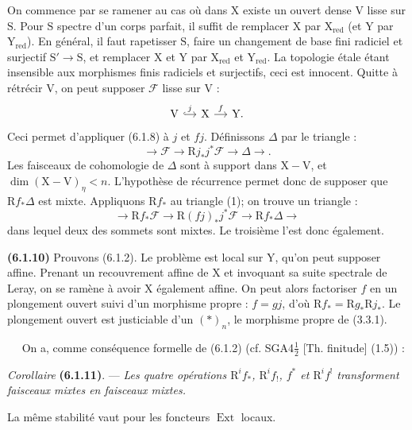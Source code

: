 \documentclass[11pt,leqno]{article}
\newcommand{\Page}[1]{\ifvmode\noindent\else\unskip\ \fi{\footnotesize\textcolor{gray}{[p.\,#1]}}\ \ignorespaces}
\begin{document}
On commence par se ramener au cas où dans \(\mathrm{X}\) existe
un ouvert dense \(\mathrm{V}\) lisse sur \(\mathrm{S}\). Pour
\(\mathrm{S}\) spectre d’un corps parfait, il suffit de remplacer
\(\mathrm{X}\) par \(\mathrm{X}_{\mathrm{red}}\) (et \(\mathrm{Y}\)
par \(\mathrm{Y}_{\mathrm{red}}\)). En général, il faut rapetisser
\(\mathrm{S}\), faire un changement de base fini radiciel et
surjectif \(\mathrm{S}'\to\mathrm{S}\), et remplacer \(\mathrm{X}\)
et \(\mathrm{Y}\) par \(\mathrm{X}_{\mathrm{red}}\) et
\(\mathrm{Y}_{\mathrm{red}}\). La topologie étale étant insensible
aux morphismes finis radiciels et surjectifs, ceci est innocent.
Quitte à rétrécir \(\mathrm{V}\), on peut supposer \(\mathscr{F}\)
lisse sur \(\mathrm{V}\) :
\[
\begin{tikzcd}[column sep=small]
\mathrm{V} \arrow[r,hook,"j"] &
\mathrm{X} \arrow[r,"f"] &
\mathrm{Y}.
\end{tikzcd}
\]
Ceci permet d’appliquer (6.1.8) à \(j\) et \(fj\). Définissons
\(\Delta\) par le triangle :
\[
\tag*{(1)}
\to\mathscr{F}\to\mathrm{R}j_*j^*\mathscr{F}\to\Delta\to.
\]
Les faisceaux de cohomologie de \(\Delta\) sont à support dans
\(\mathrm{X}-\mathrm{V}\), et
\(\dim(\mathrm{X}-\mathrm{V})_\eta<n\). L’hypothèse de récurrence
permet donc de supposer que \(\mathrm{R}f_*\Delta\) est mixte.
Appliquons \(\mathrm{R}f_*\) au triangle (1); on trouve un triangle :
\[
\to\mathrm{R}f_*\mathscr{F}
\to\mathrm{R}(fj)_*j^*\mathscr{F}
\to\mathrm{R}f_*\Delta\to
\]
dans lequel deux des sommets sont mixtes. Le troisième l’est donc
également.

\textbf{(6.1.10)} Prouvons (6.1.2). Le problème est local sur
\(\mathrm{Y}\), qu’on peut supposer affine. Prenant un recouvrement
affine de \(\mathrm{X}\) et invoquant sa suite spectrale de Leray,
on se ramène à avoir \(\mathrm{X}\) également affine. On peut alors
factoriser \(f\) en un plongement ouvert suivi d’un morphisme propre :
\(f=gj\), d’où \(\mathrm{R}f_*=\mathrm{R}g_*\mathrm{R}j_*\).
Le plongement ouvert est justiciable d’un \((*)_n\), le morphisme
propre de (3.3.1).

\Page{246}
On a, comme conséquence formelle de (6.1.2)
(cf. SGA4\(\frac{1}{2}\) [Th. finitude] (1.5)) :

\textit{Corollaire} \textbf{(6.1.11)}. — \textit{Les quatre opérations
\(\mathrm{R}^if_*\), \(\mathrm{R}^if_!\), \(f^*\) et
\(\mathrm{R}^if^!\) transforment faisceaux mixtes en faisceaux mixtes.}

La même stabilité vaut pour les foncteurs \(\operatorname{Ext}\) locaux.
\end{document}
